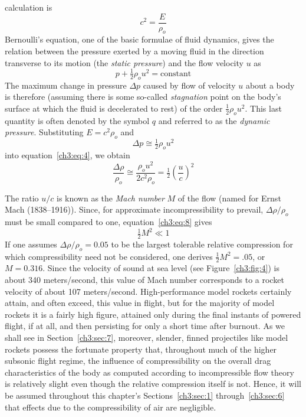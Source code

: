 calculation is
\begin{equation}\label{ch3:eq:5}
c^2 = \frac{E}{\rho_o}
\end{equation}
Bernoulli's equation, one of the basic formulae of fluid dynamics, gives the
relation between the pressure exerted by a moving fluid in the direction
transverse to its motion (the \emph{static pressure}) and the flow velocity
$u$ as
\begin{equation}\label{ch3:eq:6}
p + \tfrac{1}{2}\rho_o u^2 = \text{constant}
\end{equation}
The maximum change in pressure $\Delta p$ caused by flow of velocity $u$ about
a body is therefore (assuming there is some so-called \emph{stagnation} point
on the body's surface at which the fluid is decelerated to rest) of the order
$\tfrac{1}{2}\rho_o u^2$. This last quantity is often denoted by the symbol $q$
and referred to as the \emph{dynamic pressure}. Substituting $E = c^2\rho_o$
and
\begin{equation}\label{ch3:eq:7}
\Delta p \cong \tfrac{1}{2}\rho_o u^2
\end{equation}
into equation~\eqref{ch3:eq:4}, we obtain
\begin{equation}\label{ch3:eq:8}
\frac{\Delta\rho}{\rho_o} \cong \frac{\rho_o u^2}{2c^2\rho_o}
  = \tfrac{1}{2}\left(\frac{u}{c}\right)^2
\end{equation}

The ratio $u/c$ is known as the \emph{Mach number} $M$ of the flow (named for
Ernst Mach (1838--1916)). Since, for approximate incompressibility to prevail,
$\Delta\rho/\rho_o$ must be small compared to one, equation~\eqref{ch3:eq:8}
gives
\begin{equation}\label{ch3:eq:9}
\tfrac{1}{2}M^2 \ll 1
\end{equation}
If one assumes $\Delta\rho/\rho_o = 0.05$ to be the largest tolerable relative
compression for which compressibility need not be considered, one derives
$\tfrac{1}{2}M^2 = .05$, or $M = 0.316$. Since the velocity of sound at sea
level (see Figure~\ref{ch3:fig:4}) is about 340 meters/second, this value of
Mach number corresponds to a rocket velocity of about 107 meters/second.
High-performance model rockets certainly attain, and often exceed, this value
in flight, but for the majority of model rockets it is a fairly high figure,
attained only during the final instants of powered flight, if at all, and then
persisting for only a short time after burnout. As we shall see in
Section~\ref{ch3:sec:7}, moreover, slender, finned projectiles like model
rockets possess the fortunate property that, throughout much of the higher
subsonic flight regime, the influence of compressibility on the overall drag
characteristics of the body as computed according to incompressible flow
theory is relatively slight even though the relative compression itself is
not. Hence, it will be assumed throughout this chapter's
Sections~\ref{ch3:sec:1} through~\ref{ch3:sec:6} that effects due to the
compressibility of air are negligible.

